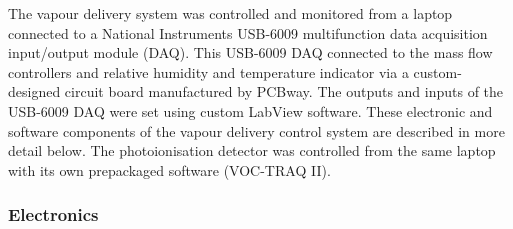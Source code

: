 \documentclass[
  a4paper,
]{scrbook}
\begin{document}
The vapour delivery system was controlled and monitored from a laptop
connected to a National Instruments USB-6009 multifunction data
acquisition input/output module (DAQ). This USB-6009 DAQ connected to
the mass flow controllers and relative humidity and temperature
indicator via a custom-designed circuit board manufactured by PCBway.
The outputs and inputs of the USB-6009 DAQ were set using custom LabView
software. These electronic and software components of the vapour
delivery control system are described in more detail below. The
photoionisation detector was controlled from the same laptop with its
own prepackaged software (VOC-TRAQ II).

\hypertarget{electronics}{%
\subsubsection*{Electronics}\label{electronics}}
\end{document}
